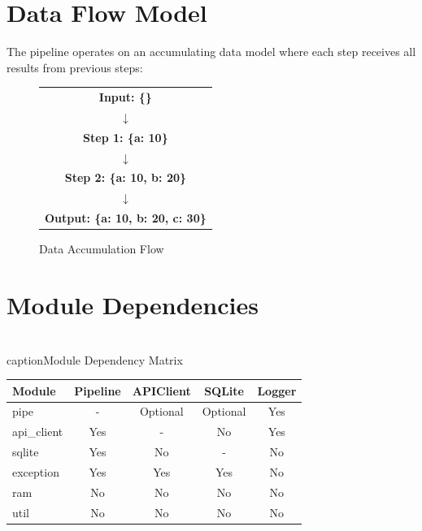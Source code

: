 \documentclass[12pt,a4paper]{report}
\begin{document}
\section{Data Flow Model}

The pipeline operates on an accumulating data model where each step receives all results from previous steps:

\begin{figure}[H]
    \centering
    \begin{tabular}{c}
        \textbf{Input: \{\}} \\
        $\downarrow$ \\
        \textbf{Step 1: \{a: 10\}} \\
        $\downarrow$ \\
        \textbf{Step 2: \{a: 10, b: 20\}} \\
        $\downarrow$ \\
        \textbf{Output: \{a: 10, b: 20, c: 30\}}
    \end{tabular}
    \caption{Data Accumulation Flow}
    \label{fig:dataflow}
\end{figure}

\section{Module Dependencies}

\begin{table}[H]
    \centering
    \\caption{Module Dependency Matrix}
    \label{tab:deps}
    \begin{tabular}{lcccc}
        \toprule
        \textbf{Module} & \textbf{Pipeline} & \textbf{APIClient} & \textbf{SQLite} & \textbf{Logger} \\
        \midrule
        pipe & - & Optional & Optional & Yes \\
        api\_client & Yes & - & No & Yes \\
        sqlite & Yes & No & - & No \\
        exception & Yes & Yes & Yes & No \\
        ram & No & No & No & No \\
        util & No & No & No & No \\
        \bottomrule
    \end{tabular}
\end{table}

\end{document}

